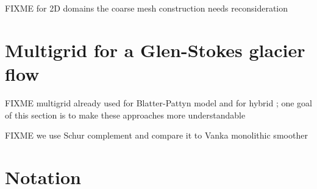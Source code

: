 \documentclass[letterpaper,final,12pt,reqno]{amsart}
\begin{document}
FIXME for 2D domains the coarse mesh construction needs reconsideration

\section{Multigrid for a Glen-Stokes glacier flow} \label{sec:stokes}

FIXME multigrid already used for Blatter-Pattyn model \cite{BrownSmithAhmadia2013} and for hybrid \cite{Jouvetetal2013}; one goal of this section is to make these approaches more understandable

FIXME we use Schur complement \cite{Bueler2021,Elmanetal2014} and compare it to Vanka monolithic smoother \cite{Farrelletal2019}

\small

\bigskip



\normalsize

\appendix
\section{Notation}
\end{document}
